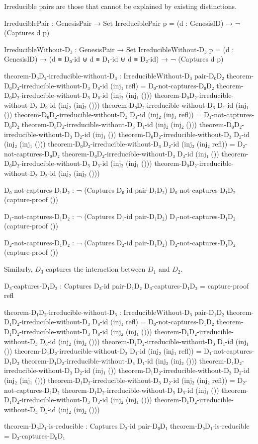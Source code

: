 \documentclass[11pt,a4paper]{book}
\begin{document}
Irreducible pairs are those that cannot be explained by existing distinctions.

\begin{code}
IrreduciblePair : GenesisPair → Set
IrreduciblePair p = (d : GenesisID) → ¬ (Captures d p)

IrreducibleWithout-D₃ : GenesisPair → Set
IrreducibleWithout-D₃ p = (d : GenesisID) → (d ≡ D₀-id ⊎ d ≡ D₁-id ⊎ d ≡ D₂-id) → ¬ (Captures d p)

theorem-D₀D₂-irreducible-without-D₃ : IrreducibleWithout-D₃ pair-D₀D₂
theorem-D₀D₂-irreducible-without-D₃ D₀-id (inj₁ refl) = D₀-not-captures-D₀D₂
theorem-D₀D₂-irreducible-without-D₃ D₀-id (inj₂ (inj₁ ())) 
theorem-D₀D₂-irreducible-without-D₃ D₀-id (inj₂ (inj₂ ()))
theorem-D₀D₂-irreducible-without-D₃ D₁-id (inj₁ ())
theorem-D₀D₂-irreducible-without-D₃ D₁-id (inj₂ (inj₁ refl)) = D₁-not-captures-D₀D₂
theorem-D₀D₂-irreducible-without-D₃ D₁-id (inj₂ (inj₂ ()))
theorem-D₀D₂-irreducible-without-D₃ D₂-id (inj₁ ())
theorem-D₀D₂-irreducible-without-D₃ D₂-id (inj₂ (inj₁ ()))
theorem-D₀D₂-irreducible-without-D₃ D₂-id (inj₂ (inj₂ refl)) = D₂-not-captures-D₀D₂
theorem-D₀D₂-irreducible-without-D₃ D₃-id (inj₁ ())
theorem-D₀D₂-irreducible-without-D₃ D₃-id (inj₂ (inj₁ ()))
theorem-D₀D₂-irreducible-without-D₃ D₃-id (inj₂ (inj₂ ()))
\end{code}

\begin{code}
D₀-not-captures-D₁D₂ : ¬ (Captures D₀-id pair-D₁D₂)
D₀-not-captures-D₁D₂ (capture-proof ())

D₁-not-captures-D₁D₂ : ¬ (Captures D₁-id pair-D₁D₂)
D₁-not-captures-D₁D₂ (capture-proof ())

D₂-not-captures-D₁D₂ : ¬ (Captures D₂-id pair-D₁D₂)
D₂-not-captures-D₁D₂ (capture-proof ())

\end{code}

Similarly, $D_3$ captures the interaction between $D_1$ and $D_2$.

\begin{code}
D₃-captures-D₁D₂ : Captures D₃-id pair-D₁D₂
D₃-captures-D₁D₂ = capture-proof refl

theorem-D₁D₂-irreducible-without-D₃ : IrreducibleWithout-D₃ pair-D₁D₂
theorem-D₁D₂-irreducible-without-D₃ D₀-id (inj₁ refl) = D₀-not-captures-D₁D₂
theorem-D₁D₂-irreducible-without-D₃ D₀-id (inj₂ (inj₁ ()))
theorem-D₁D₂-irreducible-without-D₃ D₀-id (inj₂ (inj₂ ()))
theorem-D₁D₂-irreducible-without-D₃ D₁-id (inj₁ ())
theorem-D₁D₂-irreducible-without-D₃ D₁-id (inj₂ (inj₁ refl)) = D₁-not-captures-D₁D₂
theorem-D₁D₂-irreducible-without-D₃ D₁-id (inj₂ (inj₂ ()))
theorem-D₁D₂-irreducible-without-D₃ D₂-id (inj₁ ())
theorem-D₁D₂-irreducible-without-D₃ D₂-id (inj₂ (inj₁ ()))
theorem-D₁D₂-irreducible-without-D₃ D₂-id (inj₂ (inj₂ refl)) = D₂-not-captures-D₁D₂
theorem-D₁D₂-irreducible-without-D₃ D₃-id (inj₁ ())
theorem-D₁D₂-irreducible-without-D₃ D₃-id (inj₂ (inj₁ ()))
theorem-D₁D₂-irreducible-without-D₃ D₃-id (inj₂ (inj₂ ()))

theorem-D₀D₁-is-reducible : Captures D₂-id pair-D₀D₁
theorem-D₀D₁-is-reducible = D₂-captures-D₀D₁

\end{code}
\end{document}
